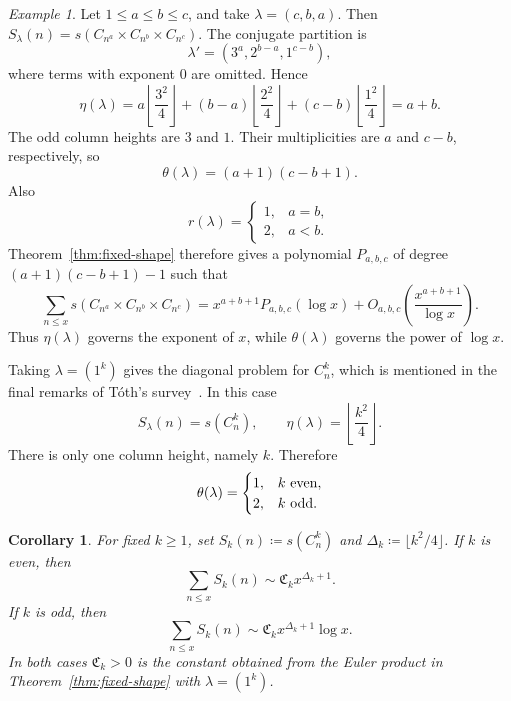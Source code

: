 \documentclass[a4paper,11pt,reqno]{amsart}
\theoremstyle{plain}
\newtheorem{corollary}[theorem]{Corollary}
\theoremstyle{remark}
\newtheorem{example}[theorem]{Example}
\numberwithin{equation}{section}
\renewcommand{\leq}{\leqslant}
\renewcommand{\geq}{\geqslant}
\begin{document}
\begin{example}
Let $1\leq a\leq b\leq c$, and take $\lambda=(c,b,a)$. Then
$S_\lambda(n)=s(C_{n^a}\times C_{n^b}\times C_{n^c})$.
The conjugate partition is
\[
        \lambda'=(3^a,2^{b-a},1^{c-b}),
\]
where terms with exponent $0$ are omitted. Hence
\[
        \eta(\lambda)
        =
        a\left\lfloor\frac{3^2}{4}\right\rfloor
        +(b-a)\left\lfloor\frac{2^2}{4}\right\rfloor
        +(c-b)\left\lfloor\frac{1^2}{4}\right\rfloor
        =
        a+b.
\]
The odd column heights are $3$ and $1$. Their multiplicities are $a$ and
$c-b$, respectively, so
\[
        \theta(\lambda)=(a+1)(c-b+1).
\]
Also
\[
        r(\lambda)=
        \begin{cases}
        1, & a=b,\\
        2, & a<b.
        \end{cases}
\]
Theorem~\ref{thm:fixed-shape} therefore gives a polynomial $P_{a,b,c}$ of
degree $(a+1)(c-b+1)-1$ such that
\[
        \sum_{n\leq x}
        s(C_{n^a}\times C_{n^b}\times C_{n^c})
        =
        x^{a+b+1}P_{a,b,c}(\log x)
        +
        O_{a,b,c}\left(\frac{x^{a+b+1}}{\log x}\right).
\]
Thus $\eta(\lambda)$ governs the exponent of $x$, while $\theta(\lambda)$
governs the power of $\log x$.
\end{example}

Taking $\lambda=(1^k)$ gives the diagonal problem for $C_n^k$, which is
mentioned in the final remarks of T\'oth's survey~\cite[Sec.~7]{TothSurvey}.
In this case
\[
        S_\lambda(n)=s(C_n^k),
        \qquad
        \eta(\lambda)=\left\lfloor\frac{k^2}{4}\right\rfloor.
\]
There is only one column height, namely $k$. Therefore
\[
        \theta(\lambda)=
        \begin{cases}
        1, & k\textnormal{ even},\\
        2, & k\textnormal{ odd}.
        \end{cases}
\]

\begin{corollary}\label{cor:diagonal}
For fixed $k\geq 1$, set $S_k(n)\coloneqq s(C_n^k)$ and
$\Delta_k\coloneqq\lfloor k^2/4\rfloor$. If $k$ is even, then
\[
        \sum_{n\leq x}S_k(n)
        \sim
        \mathfrak{C}_k x^{\Delta_k+1}.
\]
If $k$ is odd, then
\[
        \sum_{n\leq x}S_k(n)
        \sim
        \mathfrak{C}_k x^{\Delta_k+1}\log x.
\]
In both cases $\mathfrak{C}_k>0$ is the constant obtained from the Euler
product in Theorem~\ref{thm:fixed-shape} with $\lambda=(1^k)$.
\end{corollary}
\end{document}

